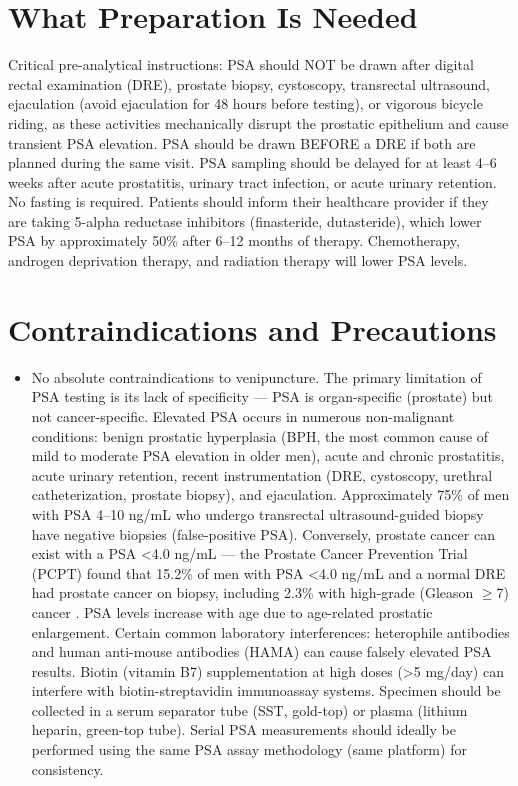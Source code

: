 \section*{What Preparation Is Needed}
Critical pre-analytical instructions: PSA should NOT be drawn after digital rectal examination (DRE), prostate biopsy, cystoscopy, transrectal ultrasound, ejaculation (avoid ejaculation for 48 hours before testing), or vigorous bicycle riding, as these activities mechanically disrupt the prostatic epithelium and cause transient PSA elevation. PSA should be drawn BEFORE a DRE if both are planned during the same visit. PSA sampling should be delayed for at least 4--6 weeks after acute prostatitis, urinary tract infection, or acute urinary retention. No fasting is required. Patients should inform their healthcare provider if they are taking 5-alpha reductase inhibitors (finasteride, dutasteride), which lower PSA by approximately 50\% after 6--12 months of therapy. Chemotherapy, androgen deprivation therapy, and radiation therapy will lower PSA levels.

\section*{Contraindications and Precautions}
\begin{itemize}
  \item No absolute contraindications to venipuncture. The primary limitation of PSA testing is its lack of specificity --- PSA is organ-specific (prostate) but not cancer-specific. Elevated PSA occurs in numerous non-malignant conditions: benign prostatic hyperplasia (BPH, the most common cause of mild to moderate PSA elevation in older men), acute and chronic prostatitis, acute urinary retention, recent instrumentation (DRE, cystoscopy, urethral catheterization, prostate biopsy), and ejaculation. Approximately 75\% of men with PSA 4--10 ng/mL who undergo transrectal ultrasound-guided biopsy have negative biopsies (false-positive PSA). Conversely, prostate cancer can exist with a PSA <4.0 ng/mL --- the Prostate Cancer Prevention Trial (PCPT) found that 15.2\% of men with PSA <4.0 ng/mL and a normal DRE had prostate cancer on biopsy, including 2.3\% with high-grade (Gleason $\geq$7) cancer \cite{thompson2004prevalence}. PSA levels increase with age due to age-related prostatic enlargement. Certain common laboratory interferences: heterophile antibodies and human anti-mouse antibodies (HAMA) can cause falsely elevated PSA results. Biotin (vitamin B7) supplementation at high doses (>5 mg/day) can interfere with biotin-streptavidin immunoassay systems. Specimen should be collected in a serum separator tube (SST, gold-top) or plasma (lithium heparin, green-top tube). Serial PSA measurements should ideally be performed using the same PSA assay methodology (same platform) for consistency.
\end{itemize}
